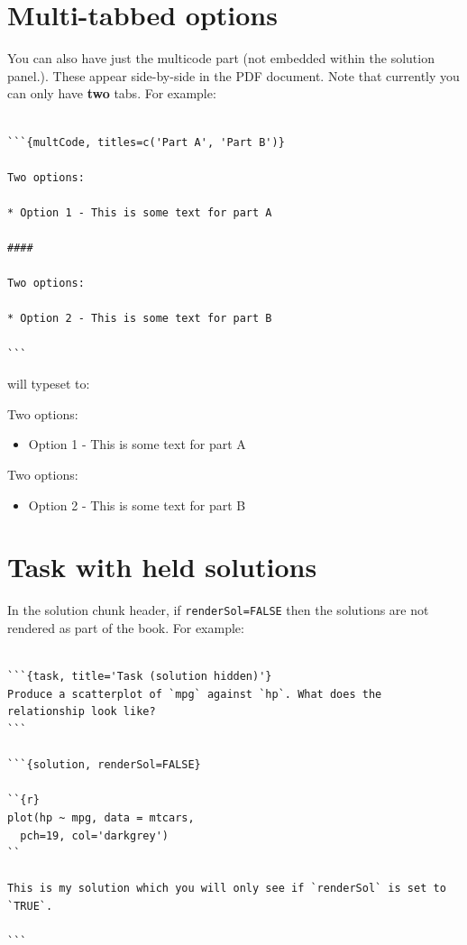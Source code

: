 \documentclass[
  oneside]{krantz}
\providecommand{\tightlist}{%
  \setlength{\itemsep}{0pt}\setlength{\parskip}{0pt}}
\newcommand{\bmp}{\begin{minipage}[c]{0.5\textwidth}}
\newcommand{\emp}{\end{minipage}}
\newcommand{\bblockST}[1]{\begin{tcolorbox}[title = #1, colframe=taskCol1, breakable, parbox = false]}
\newcommand{\eblockST}{\end{tcolorbox}}
\theoremstyle{definition}
\theoremstyle{definition}
\theoremstyle{definition}
\theoremstyle{remark}
\begin{document}
\hypertarget{multi-tabbed-options}{%
\section{Multi-tabbed options}\label{multi-tabbed-options}}

You can also have just the multicode part (not embedded within the solution panel.). These appear side-by-side in the PDF document. Note that currently you can only have \textbf{two} tabs. For example:

\begin{verbatim}

```{multCode, titles=c('Part A', 'Part B')}

Two options: 

* Option 1 - This is some text for part A

####

Two options:
    
* Option 2 - This is some text for part B

```
\end{verbatim}

will typeset to:

\bmp
\bblockST{Part A}

Two options:

\begin{itemize}
\tightlist
\item
  Option 1 - This is some text for part A
\end{itemize}

\eblockST
\emp
\hspace{0.01\textwidth}
\bmp\bblockST{Part B}

Two options:

\begin{itemize}
\tightlist
\item
  Option 2 - This is some text for part B
\end{itemize}

\eblockST
\emp

\hypertarget{task-with-held-solutions}{%
\section{Task with held solutions}\label{task-with-held-solutions}}

In the solution chunk header, if \texttt{renderSol=FALSE} then the solutions are not rendered as part of the book. For example:

\begin{verbatim}

```{task, title='Task (solution hidden)'}
Produce a scatterplot of `mpg` against `hp`. What does the relationship look like?
```

```{solution, renderSol=FALSE}

``{r}
plot(hp ~ mpg, data = mtcars, 
  pch=19, col='darkgrey')
``

This is my solution which you will only see if `renderSol` is set to `TRUE`.

```
\end{verbatim}
\end{document}
